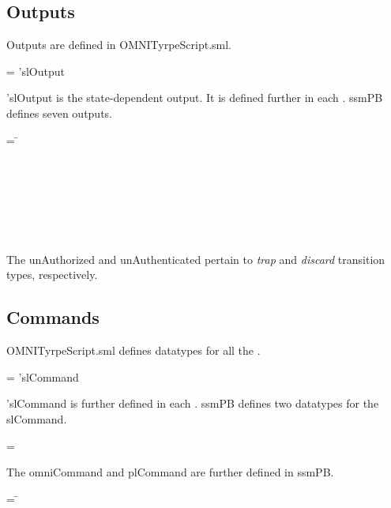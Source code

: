 \documentclass[../../main/main.tex]{subfiles}
\begin{document}
\subsection{Outputs}
Outputs are defined in OMNITyrpeScript.sml.

 =   \HOLTokenBar{}  'slOutput

 'slOutput is the state-dependent output.  It is defined further in each .  ssmPB defines seven outputs.

\begin{tabbing}
 = \= \\
					\>\HOLTokenBar{}  \\
					\>\HOLTokenBar{}  \\
					\>\HOLTokenBar{} \\
         				\>\HOLTokenBar{}  \\
					\>\HOLTokenBar{}  \\
					\>\HOLTokenBar{} \\
         				\>\HOLTokenBar{} 
\end{tabbing}

The unAuthorized and unAuthenticated pertain to \textit{trap} and \textit{discard} transition types, respectively.

\subsection{Commands}
OMNITyrpeScript.sml defines datatypes for all the .

 =   \HOLTokenBar{}  'slCommand

 'slCommand is further defined in each .  ssmPB defines two datatypes for the slCommand.

 =   \HOLTokenBar{}  

The omniCommand and plCommand are further defined in ssmPB.

\begin{tabbing}
 = \= \\
						\>\HOLTokenBar{} \\
            					\>\HOLTokenBar{}  \\
						\>\HOLTokenBar{} \\
            					\>\HOLTokenBar{}  \\
						\>\HOLTokenBar{} 
\end{tabbing}
\end{document}
